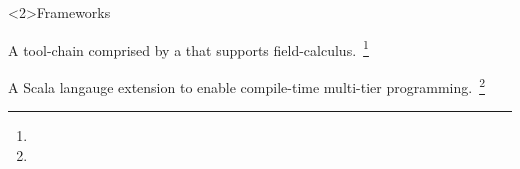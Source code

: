 \begin{frame}<2>{Frameworks}
  \begin{card}
    A tool-chain comprised by a  that supports field-calculus.~\footnote[frame]{}
  \end{card}
  \pause
  \begin{card}[ScalaLoci]
    A Scala langauge extension to enable compile-time multi-tier programming.~\footnote[frame]{} 
  \end{card}
\end{frame}